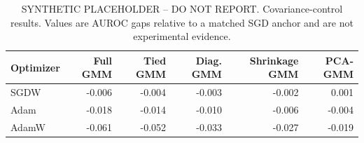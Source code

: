 \begin{table}[t]
\caption{SYNTHETIC PLACEHOLDER -- DO NOT REPORT. Covariance-control results.
Values are AUROC gaps relative to a matched SGD anchor and are not experimental
evidence.}
\label{tab:dummy-covariance-controls}
\begin{center}
\footnotesize
\setlength{\tabcolsep}{5pt}
\renewcommand{\arraystretch}{1.15}
\begin{tabular}{@{}lrrrrr@{}}
\toprule
Optimizer & Full GMM & Tied GMM & Diag. GMM & Shrinkage GMM & PCA-GMM \\
\midrule
SGDW  & -0.006 & -0.004 & -0.003 & -0.002 &  0.001 \\
Adam  & -0.018 & -0.014 & -0.010 & -0.006 & -0.004 \\
AdamW & -0.061 & -0.052 & -0.033 & -0.027 & -0.019 \\
\bottomrule
\end{tabular}
\end{center}
\end{table}
